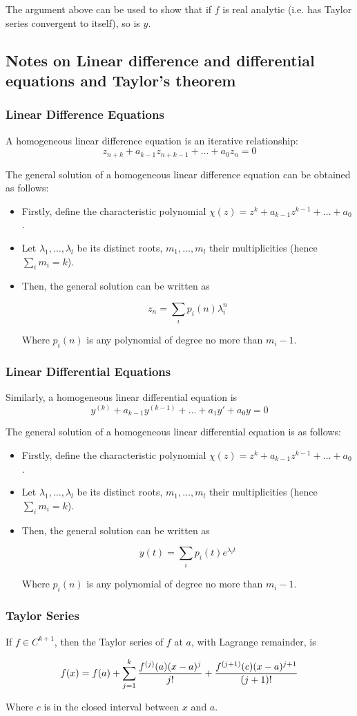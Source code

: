 \documentclass{article} %
\theoremstyle{break}
\begin{document}
The argument above can be used to show that if $f$ is real analytic (i.e. has Taylor series convergent to itself), so is $y$.

\subsection{Notes on Linear difference and differential equations and Taylor's theorem}

\subsubsection{Linear Difference Equations}

A homogeneous linear difference equation is an iterative relationship:
\[z_{n+k}+a_{k-1}z_{n+k-1}+\dots+a_0z_n=0\]

The general solution of a homogeneous linear difference equation can be obtained as follows:
\begin{itemize}
\item Firstly, define the characteristic polynomial $\chi(z)=z^k+a_{k-1}z^{k-1}+\dots+a_0$.
\item Let $\lambda_1, \dots, \lambda_l$ be its distinct roots, $m_1, \dots, m_l$ their multiplicities (hence $\sum_im_i=k$).
\item Then, the general solution can be written as

\[z_n=\sum_ip_i(n)\lambda_i^n\]

Where $p_i(n)$ is any polynomial of degree no more than $m_i-1$.
\end{itemize}

\subsubsection{Linear Differential Equations}

Similarly, a homogeneous linear differential equation is
\[y^{(k)}+a_{k-1}y^{(k-1)}+\dots+a_1y'+a_0y=0\]

The general solution of a homogeneous linear differential equation is as follows:
\begin{itemize}
\item Firstly, define the characteristic polynomial $\chi(z)=z^k+a_{k-1}z^{k-1}+\dots+a_0$.
\item Let $\lambda_1, \dots, \lambda_l$ be its distinct roots, $m_1, \dots, m_l$ their multiplicities (hence $\sum_im_i=k$).
\item Then, the general solution can be written as

\[y(t)=\sum_ip_i(t)e^{\lambda_i t}\]

Where $p_i(n)$ is any polynomial of degree no more than $m_i-1$.
\end{itemize}


\subsubsection{Taylor Series}

If $f\in C^{k+1}$, then the Taylor series of $f$ at $a$, with Lagrange remainder, is

\[f(x)=f(a)+\sum_{j=1}^{k}{f^{(j)}(a)(x-a)^j\over j!}+{f^{(j+1)}(c)(x-a)^{j+1}\over(j+1)!}\] 

Where $c$ is in the closed interval between $x$ and $a$.
\end{document}
